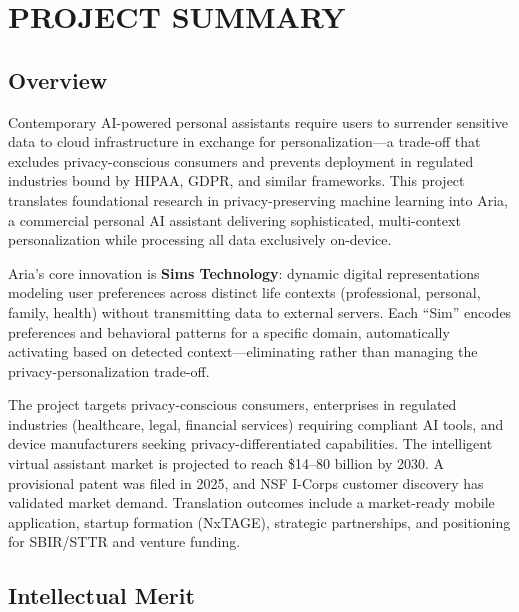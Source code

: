 \documentclass[11pt]{article}
\begin{document}
\thispagestyle{empty}
\section*{PROJECT SUMMARY}

\subsection*{Overview}

Contemporary AI-powered personal assistants require users to surrender sensitive data to cloud infrastructure in exchange for personalization---a trade-off that excludes privacy-conscious consumers and prevents deployment in regulated industries bound by HIPAA, GDPR, and similar frameworks. This project translates foundational research in privacy-preserving machine learning into Aria, a commercial personal AI assistant delivering sophisticated, multi-context personalization while processing all data exclusively on-device.

Aria's core innovation is \textbf{Sims Technology}: dynamic digital representations modeling user preferences across distinct life contexts (professional, personal, family, health) without transmitting data to external servers. Each ``Sim'' encodes preferences and behavioral patterns for a specific domain, automatically activating based on detected context---eliminating rather than managing the privacy-personalization trade-off.

The project targets privacy-conscious consumers, enterprises in regulated industries (healthcare, legal, financial services) requiring compliant AI tools, and device manufacturers seeking privacy-differentiated capabilities. The intelligent virtual assistant market is projected to reach \$14--80 billion by 2030. A provisional patent was filed in 2025, and NSF I-Corps customer discovery has validated market demand. Translation outcomes include a market-ready mobile application, startup formation (NxTAGE), strategic partnerships, and positioning for SBIR/STTR and venture funding.

\subsection*{Intellectual Merit}
\end{document}
